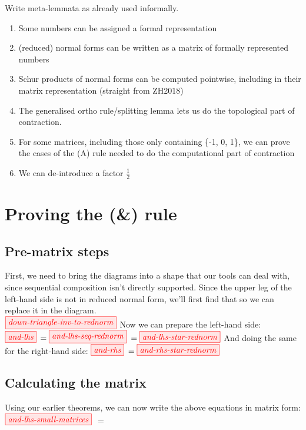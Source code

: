 \begin{TODOLIST}
    Write meta-lemmata as already used informally.
    \begin{enumerate}
        \item Some numbers can be assigned a formal representation
        \item (reduced) normal forms can be written as a matrix of formally %
            represented numbers
        \item Schur products of normal forms can be computed pointwise,
            including in their matrix representation (straight from ZH2018)
        \item The generalised ortho rule/splitting lemma lets us do the
            topological part of contraction.
        \item For some matrices, including those only containing \{-1, 0, 1\}, we
            can prove the cases of the (A) rule needed to do the computational
            part of contraction
        \item We can de-introduce a factor $\frac{1}{2}$
    \end{enumerate}
\end{TODOLIST}

\section{Proving the (\&) rule}

\subsection{Pre-matrix steps}
First, we need to bring the diagrams into a shape that our tools can deal with,
since sequential composition isn't directly supported. Since the upper leg of
the left-hand side is not in reduced normal form, we'll first find that so we
can replace it in the diagram.\\
$\tikzfig{down-triangle-inv-to-rednorm}$
Now we can prepare the left-hand side:\\
$\tikzfig{and-lhs}$ 
$= \tikzfig{and-lhs-seq-rednorm}$ 
$= \tikzfig{and-lhs-star-rednorm}$
And doing the same for the right-hand side:
$\tikzfig{and-rhs}$
$= \tikzfig{and-rhs-star-rednorm}$\\

\subsection{Calculating the matrix}
Using our earlier theorems, we can now write the above equations in matrix
form:\\
$\tikzfig{and-lhs-small-matrices}$
$= $
